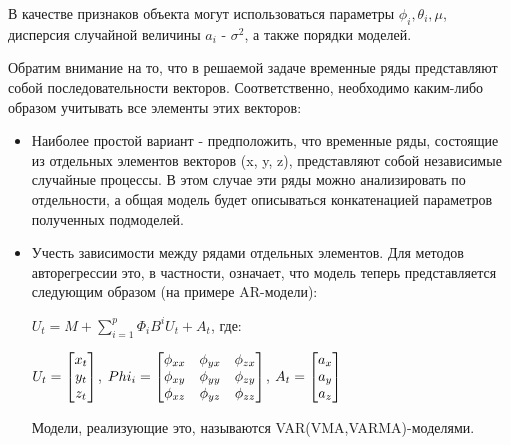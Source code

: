 В качестве признаков объекта могут использоваться параметры $\phi_i, \theta_i, \mu$, дисперсия случайной величины $a_i$ - $\sigma^2$, а также порядки моделей.

Обратим внимание на то, что в решаемой задаче временные ряды представляют собой последовательности векторов. Соответственно, необходимо каким-либо образом учитывать все элементы этих векторов:

\begin{itemize}
\item Наиболее простой вариант - предположить, что временные ряды, состоящие из отдельных элементов векторов (x, y, z), представляют собой независимые случайные процессы. В этом случае эти ряды можно анализировать по отдельности, а общая модель будет описываться конкатенацией параметров полученных подмоделей.
\item Учесть зависимости между рядами отдельных элементов. Для методов авторегрессии это, в частности, означает, что модель теперь представляется следующим образом (на примере AR-модели):

$U_t=M+\sum_{i=1}^p \Phi_iB^i U_t + A_t$,  где:

 $U_t=\begin{bmatrix} x_t \\ y_t \\ z_t \\ \end{bmatrix}$, $Phi_i=\begin{bmatrix} \phi_{xx} & \phi_{yx} & \phi_{zx} \\ \phi_{xy} & \phi_{yy} & \phi_{zy} \\ \phi_{xz} & \phi_{yz} & \phi_{zz} \\ \end{bmatrix}$, 
 $A_t=\begin{bmatrix} a_x \\ a_y \\ a_z \\ \end{bmatrix}$

Модели, реализующие это, называются VAR(VMA,VARMA)-моделями. 
\end{itemize}













